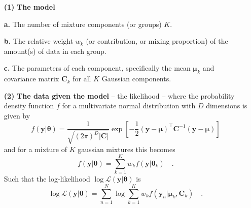 \documentclass{elsarticle}
\newcommand{\vect}[1]{\boldsymbol{\mathbf{#1}}}
\renewcommand{\vec}[1]{\vect{#1}}
\def\cov{C}
\def\veccov{\vect{\cov}}
\def\vecmean{\vect{\mu}}
\def\weight{w}
\def\datum{y}
\def\data{\vect{\datum}}
\def\likelihood{\mathcal{L}}
\begin{document}
\begin{itemize}
    \item[\textbf{(1)}] \textbf{The model}
    \item[\textbf{a.}]  The number of mixture components (or groups) $K$.
    \item[\textbf{b.}]  The relative weight $w_k$ (or contribution, or mixing 
                        proportion) of the amount(s) of data in each group. 


    \item[\textbf{c.}]  The parameters of each component, specifically the mean
                        $\vecmean_k$ and covariance matrix $\veccov_k$ for all 
                        $K$ Gaussian components.

    \item[\textbf{(2)}] \textbf{The data given the model} -- the likelihood --
                        where the probability density function $f$ for a
                        multivariate normal distribution with $D$ dimensions
                        is given by
                        \begin{equation}
                            f(\vec{\data}|\vec{\theta}) = \frac{1}{\sqrt{(2\pi)^{D}|\veccov|}}\exp{\left[-\frac{1}{2}(\vec{\data} - \vecmean)^\intercal\veccov^{-1}(\vec{\data}-\vecmean)\right]}
                        \end{equation}
                        \noindent{}and for a mixture of $K$ gaussian mixtures
                        this becomes
                        \begin{equation}
                            f(\vec{\data}|\vec{\theta}) = \sum_{k=1}^{K}\weight_{k}f(\vec{\data}|\vec{\theta}_{k}) \quad .
                        \end{equation}
                        \noindent{}Such that the log-likelihood $\log\likelihood(\vec{\data}|\vec{\theta})$ is
                        \begin{equation}
                            \log\likelihood(\vec{\data}|\vec{\theta}) = \sum_{n=1}^{N}\log\sum_{k=1}^{K}\weight_{k}f(\vec{\data}_{n}|\vecmean_{k},\veccov_{k}) \quad .
                        \end{equation}



\end{itemize}
\end{document}
